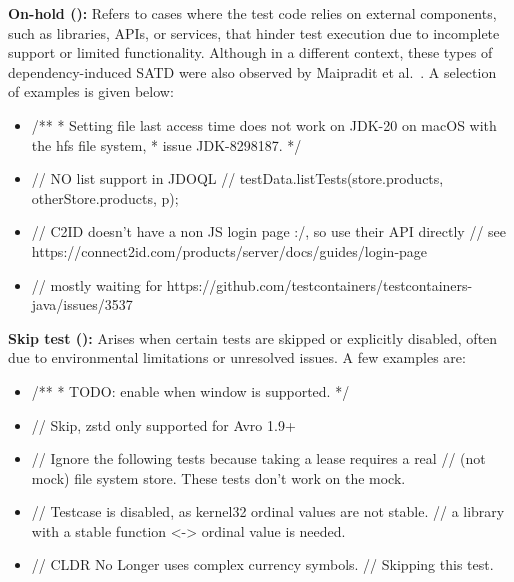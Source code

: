 \textbf{On-hold (\onHoldCount{}):} Refers to cases where the test code relies on external components, such as libraries, APIs, or services, that hinder test execution due to incomplete support or limited functionality. Although in a different context, these types of dependency-induced SATD were also observed by Maipradit et al.~\cite{maipradit_wait_2020}. A selection of examples is given below:
\begin{itemize}[itemsep=-2pt]
    \item \textcolor{commentColor}{/**
 * Setting file last access time does not work on JDK-20 on macOS with the hfs file system,
 * issue JDK-8298187.
 */}
    \item \textcolor{commentColor}{// NO list support in JDOQL
    \newline //        testData.listTests(store.products, otherStore.products, p);}
    \item \textcolor{commentColor}{// C2ID doesn't have a non JS login page :/, so use their API directly
    // see https://connect2id.com/products/server/\allowbreak docs/guides/login-page}
    \item \textcolor{commentColor}{// mostly waiting for https://github.com/testcontainers/\allowbreak testcontainers-java/issues/3537}

\end{itemize}

\textbf{Skip test (\skipTestCount{}):} Arises when certain tests are skipped or explicitly disabled, often due to environmental limitations or unresolved issues. A few examples are:
\begin{itemize}[itemsep=-2pt]
    \item \textcolor{commentColor}{/**
    * TODO: enable when window is supported.
    */}
    \item \textcolor{commentColor}{// Skip, zstd only supported for Avro 1.9+}
    \item \textcolor{commentColor}{// Ignore the following tests because taking a lease requires a real
    // (not mock) file system store. These tests don't work on the mock.}
    \item \textcolor{commentColor}{// Testcase is disabled, as kernel32 ordinal values are not stable.
    // a library with a stable function <-> ordinal value is needed.}
    \item \textcolor{commentColor}{//  CLDR No Longer uses complex currency symbols.
    //  Skipping this test.}

\end{itemize}

